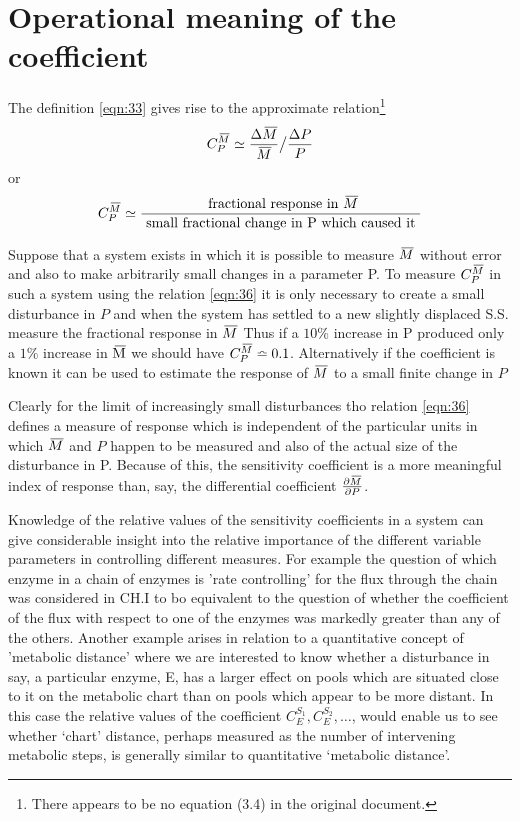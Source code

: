 \section{Operational meaning of the coefficient}

The definition \eqref{eqn:33} gives rise to the approximate relation\footnote{There appears to be no equation (3.4) in the original document.}
%
\begin{equation}
C_{P}^{\,\overline{\!{M}}} \simeq \frac{\Delta \,\overline{\!{M}}}{\,\overline{\!{M}}} \big/ \frac{\Delta P}{P}
\label{eqn:35}
\end{equation}
%
or
%
\begin{equation}
C_{P}^{\,\overline{\!{M}}} \simeq \frac{\text { fractional response in } \,\overline{\!{M}}}{\text { small fractional change in P which caused it }}
\label{eqn:36}
\end{equation}

Suppose that a system exists in which it is possible to measure $\,\overline{\!{M}}$ without error and also to make arbitrarily small changes in a parameter P. To measure $C_P^{\,\overline{\!{M}}}$ in such a system using the relation \eqref{eqn:36} it is only necessary to create a small disturbance in $P$ and when the system has settled to a new slightly displaced S.S. measure the fractional response in $\,\overline{\!{M}}$ Thus if a $10 \%$ increase in P produced only a $1 \%$ increase in $\,\overline{\!{\mathrm{M}}}$ we should have $C_P^{\,\overline{\!{M}}} \bumpeq 0.1$. Alternatively if the coefficient is known it can be used to estimate the response of $\,\overline{\!{M}}$ to a small finite change in $P$

Clearly for the limit of increasingly small disturbances tho relation \eqref{eqn:36} defines a measure of response which is independent of the particular units in which $\,\overline{\!{M}}$ and $P$ happen to be measured and also of the actual size of the disturbance in P. Because of this, the sensitivity coefficient is a more meaningful index of response than, say, the differential coefficient $\frac{\partial \,\overline{\!{M}}}{\partial P}$.

Knowledge of the relative values of the sensitivity coefficients in a system can give considerable insight into the relative importance of the different variable parameters in controlling different measures. For example the question of which enzyme in a chain of enzymes is 'rate controlling' for the flux through the chain was considered in CH.I to bo equivalent to the question of whether the coefficient of the flux with respect to one of the enzymes was markedly greater than any of the others. Another example arises in relation to a quantitative concept of 'metabolic distance' where we are interested to know whether a disturbance in say, a particular enzyme, E, has a larger effect on pools which are situated close to it on the metabolic chart than on pools which appear to be more distant. In this case the relative values of the coefficient $C_{E}^{S_1}, C_{E}^{S_2}, \ldots$, would enable us to see whether `chart' distance, perhaps measured as the number of intervening metabolic steps, is generally similar to quantitative `metabolic distance'.

